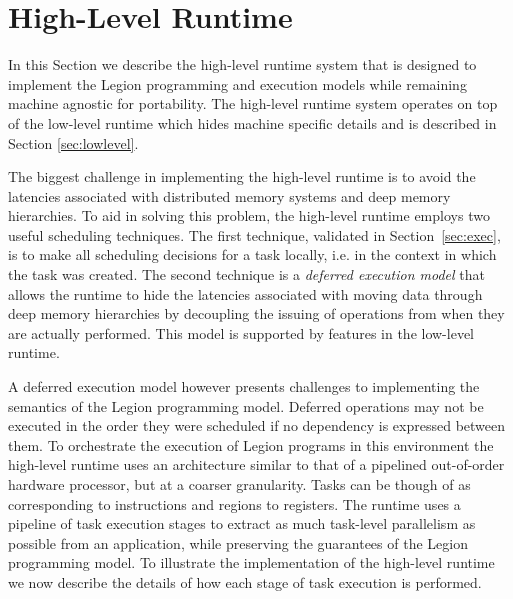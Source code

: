 
\section{High-Level Runtime} 
\label{sec:highlevel}
In this Section we describe the high-level runtime system
that is designed to implement the Legion programming
and execution models while remaining machine agnostic for portability.  
The high-level runtime system operates on top of the 
low-level runtime which hides machine specific details
and is described in Section \ref{sec:lowlevel}.

The biggest challenge in implementing the high-level
runtime is to avoid the latencies associated with distributed
memory systems and deep memory hierarchies.  To aid
in solving this problem, the high-level runtime employs two useful 
scheduling techniques.  The first technique, validated in 
Section~\ref{sec:exec}, is to make all scheduling decisions for a
task locally, i.e. in the context in which the
task was created.  The second technique is a {\em deferred execution model} 
that allows the runtime to hide the latencies associated
with moving data through deep memory hierarchies by decoupling the issuing
of operations
from when they are actually performed.  This model is supported
by features in the low-level runtime.


A deferred execution model however presents challenges to implementing
the semantics of the Legion programming model.  Deferred operations
may not be executed in the order they were scheduled if no dependency
is expressed between them.  To orchestrate the execution of Legion
programs in this environment the high-level runtime uses an architecture
similar to that of a pipelined out-of-order hardware processor, but at
a coarser granularity.  Tasks can be though of as corresponding to instructions
and regions to registers.  The runtime uses a pipeline of task execution stages
to extract
as much task-level parallelism as possible from an application, while
preserving the guarantees of the Legion programming model.  To illustrate
the implementation of the high-level runtime we now describe the
details of how each stage of task execution is performed.

